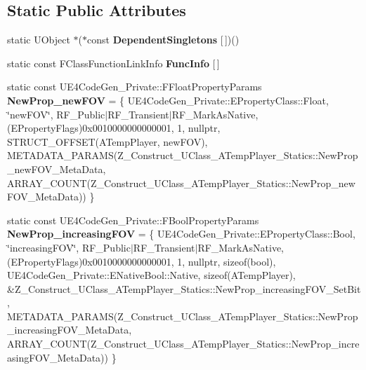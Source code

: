 \subsection*{Static Public Attributes}
\begin{DoxyCompactItemize}
\item 
\mbox{\label{struct_z___construct___u_class___a_temp_player___statics_ab1d524c2d6d0373d265cd7d471a6ac48}} 
static U\+Object $\ast$($\ast$const {\bfseries Dependent\+Singletons} \mbox{[}$\,$\mbox{]})()
\item 
static const F\+Class\+Function\+Link\+Info {\bfseries Func\+Info} \mbox{[}$\,$\mbox{]}
\item 
\mbox{\label{struct_z___construct___u_class___a_temp_player___statics_a45ab10fdd5747c56ca14c27716f05fa3}} 
static const U\+E4\+Code\+Gen\+\_\+\+Private\+::\+F\+Float\+Property\+Params {\bfseries New\+Prop\+\_\+new\+F\+OV} = \{ U\+E4\+Code\+Gen\+\_\+\+Private\+::\+E\+Property\+Class\+::\+Float, \char`\"{}new\+F\+OV\char`\"{}, R\+F\+\_\+\+Public$\vert$R\+F\+\_\+\+Transient$\vert$R\+F\+\_\+\+Mark\+As\+Native, (E\+Property\+Flags)0x0010000000000001, 1, nullptr, S\+T\+R\+U\+C\+T\+\_\+\+O\+F\+F\+S\+E\+T(\+A\+Temp\+Player, new\+F\+O\+V), M\+E\+T\+A\+D\+A\+T\+A\+\_\+\+P\+A\+R\+A\+M\+S(\+Z\+\_\+\+Construct\+\_\+\+U\+Class\+\_\+\+A\+Temp\+Player\+\_\+\+Statics\+::\+New\+Prop\+\_\+new\+F\+O\+V\+\_\+\+Meta\+Data, A\+R\+R\+A\+Y\+\_\+\+C\+O\+U\+N\+T(\+Z\+\_\+\+Construct\+\_\+\+U\+Class\+\_\+\+A\+Temp\+Player\+\_\+\+Statics\+::\+New\+Prop\+\_\+new\+F\+O\+V\+\_\+\+Meta\+Data)) \}
\item 
\mbox{\label{struct_z___construct___u_class___a_temp_player___statics_a4d647dfdcc5843d8e88d4a3cf6d88088}} 
static const U\+E4\+Code\+Gen\+\_\+\+Private\+::\+F\+Bool\+Property\+Params {\bfseries New\+Prop\+\_\+increasing\+F\+OV} = \{ U\+E4\+Code\+Gen\+\_\+\+Private\+::\+E\+Property\+Class\+::\+Bool, \char`\"{}increasing\+F\+OV\char`\"{}, R\+F\+\_\+\+Public$\vert$R\+F\+\_\+\+Transient$\vert$R\+F\+\_\+\+Mark\+As\+Native, (E\+Property\+Flags)0x0010000000000001, 1, nullptr, sizeof(bool), U\+E4\+Code\+Gen\+\_\+\+Private\+::\+E\+Native\+Bool\+::\+Native, sizeof(\+A\+Temp\+Player), \&\+Z\+\_\+\+Construct\+\_\+\+U\+Class\+\_\+\+A\+Temp\+Player\+\_\+\+Statics\+::\+New\+Prop\+\_\+increasing\+F\+O\+V\+\_\+\+Set\+Bit, M\+E\+T\+A\+D\+A\+T\+A\+\_\+\+P\+A\+R\+A\+M\+S(\+Z\+\_\+\+Construct\+\_\+\+U\+Class\+\_\+\+A\+Temp\+Player\+\_\+\+Statics\+::\+New\+Prop\+\_\+increasing\+F\+O\+V\+\_\+\+Meta\+Data, A\+R\+R\+A\+Y\+\_\+\+C\+O\+U\+N\+T(\+Z\+\_\+\+Construct\+\_\+\+U\+Class\+\_\+\+A\+Temp\+Player\+\_\+\+Statics\+::\+New\+Prop\+\_\+increasing\+F\+O\+V\+\_\+\+Meta\+Data)) \}

\end{DoxyCompactItemize}

